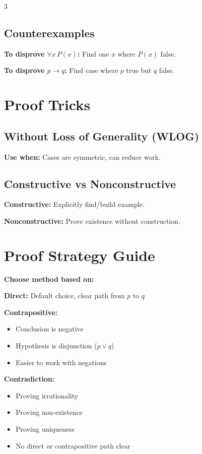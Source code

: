 \documentclass[8pt]{article}
\begin{document}
\begin{multicols}{3}
\subsection*{Counterexamples}
\textbf{To disprove $\forall x\, P(x)$:} Find one $x$ where $P(x)$ false.

\textbf{To disprove $p \to q$:} Find case where $p$ true but $q$ false.

\section*{Proof Tricks}

\subsection*{Without Loss of Generality (WLOG)}
\textbf{Use when:} Cases are symmetric, can reduce work.


\subsection*{Constructive vs Nonconstructive}
\textbf{Constructive:} Explicitly find/build example.

\textbf{Nonconstructive:} Prove existence without construction.


\section*{Proof Strategy Guide}
\textbf{Choose method based on:}

\textbf{Direct:} Default choice, clear path from $p$ to $q$

\textbf{Contrapositive:}
\begin{itemize}[nosep]
\item Conclusion is negative
\item Hypothesis is disjunction ($p \lor q$)
\item Easier to work with negations
\end{itemize}

\textbf{Contradiction:}
\begin{itemize}[nosep]
\item Proving irrationality
\item Proving non-existence
\item Proving uniqueness
\item No direct or contrapositive path clear
\end{itemize}

\end{multicols}
\end{document}
